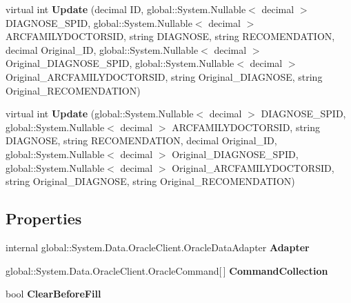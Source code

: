 \begin{CompactItemize}
\item 
virtual int \textbf{Update} (decimal ID, global::System.Nullable$<$ decimal $>$ DIAGNOSE\_\-SPID, global::System.Nullable$<$ decimal $>$ ARCFAMILYDOCTORSID, string DIAGNOSE, string RECOMENDATION, decimal Original\_\-ID, global::System.Nullable$<$ decimal $>$ Original\_\-DIAGNOSE\_\-SPID, global::System.Nullable$<$ decimal $>$ Original\_\-ARCFAMILYDOCTORSID, string Original\_\-DIAGNOSE, string Original\_\-RECOMENDATION)\label{class_automatic_medical_system_1_1_data_set2_table_adapters_1_1_d_i_a_g_n_o_s_e___f_m___d_o_c_t_o_r_table_adapter_aba3253d467957c063d642f32ad58905}

\item 
virtual int \textbf{Update} (global::System.Nullable$<$ decimal $>$ DIAGNOSE\_\-SPID, global::System.Nullable$<$ decimal $>$ ARCFAMILYDOCTORSID, string DIAGNOSE, string RECOMENDATION, decimal Original\_\-ID, global::System.Nullable$<$ decimal $>$ Original\_\-DIAGNOSE\_\-SPID, global::System.Nullable$<$ decimal $>$ Original\_\-ARCFAMILYDOCTORSID, string Original\_\-DIAGNOSE, string Original\_\-RECOMENDATION)\label{class_automatic_medical_system_1_1_data_set2_table_adapters_1_1_d_i_a_g_n_o_s_e___f_m___d_o_c_t_o_r_table_adapter_d6e4cd95d2f90cc45418e940823a74d5}

\end{CompactItemize}
\subsection*{Properties}
\begin{CompactItemize}
\item 
internal global::System.Data.OracleClient.OracleDataAdapter \textbf{Adapter}\hspace{0.3cm}{\tt  [get]}\label{class_automatic_medical_system_1_1_data_set2_table_adapters_1_1_d_i_a_g_n_o_s_e___f_m___d_o_c_t_o_r_table_adapter_1cdf06253196d478ac78a00a62031f90}

\item 
global::System.Data.OracleClient.OracleCommand[$\,$] \textbf{CommandCollection}\hspace{0.3cm}{\tt  [get]}\label{class_automatic_medical_system_1_1_data_set2_table_adapters_1_1_d_i_a_g_n_o_s_e___f_m___d_o_c_t_o_r_table_adapter_f28a412e24c93eee7d85692a0f199495}

\item 
bool \textbf{ClearBeforeFill}\hspace{0.3cm}{\tt  [get, set]}\label{class_automatic_medical_system_1_1_data_set2_table_adapters_1_1_d_i_a_g_n_o_s_e___f_m___d_o_c_t_o_r_table_adapter_716bceee6532bdfb37c1cc5064db96ee}

\end{CompactItemize}


